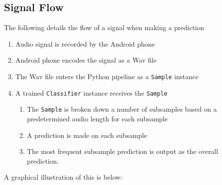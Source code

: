 \documentclass[journal]{IEEEtran}
\begin{document}
\subsection{Signal Flow}\label{Signal Flow}
The following details the flow of a signal when making a prediction
\begin{enumerate}
\item Audio signal is recorded by the Android phone
\item Android phone encodes the signal as a Wav file
\item The Wav file enters the Python pipeline as a \texttt{Sample} instance
\item A trained \texttt{Classifier} instance receives the \texttt{Sample}
\begin{enumerate}
\item The \texttt{Sample} is broken down a number of subsamples based on a predetermined audio length for each subsample
\item A prediction is made on each subsample
\item The most frequent subsample prediction is output as the overall prediction.
\end{enumerate}
\end{enumerate}
A graphical illustration of this is below:\\


\end{document}
